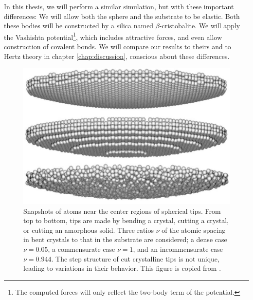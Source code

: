 \documentclass[twoside,english]{uiofysmaster}
\begin{document}
In this thesis, we will perform a similar simulation, but with these important differences: 
We will allow both the sphere and the substrate to be elastic. 
Both these bodies will be constructed by a silica named $\beta$-cristobalite.
We will apply the Vashishta potential\footnote{The computed forces will only reflect the two-body term of the potential.}, which includes attractive forces, and even allow construction of covalent bonds. 
We will compare our results to theirs and to Hertz theory in chapter \ref{chap:discussion}, conscious about these differences. 


\begin{figure}
\centering
\includegraphics[width=0.5\linewidth]{figures/Robbins/surfaceSrtucture}
\caption{Snapshots of atoms near the center regions of spherical tips. From top to bottom, tips are made by bending a crystal, cutting a crystal, or cutting an amorphous solid. Three ratios $\nu$ of the atomic spacing in bent crystals to that in the substrate are considered; a dense case $\nu=0.05$, a commensurate case $\nu=1$, and an incommensurate case $\nu=0.944$. The step structure of cut crystalline tips is not unique, leading to variations in their behavior.
This figure is copied from \cite{RobbinsSingleAsperity}.}
\label{fig:robbinsSurfaces}
\end{figure}
\end{document}
